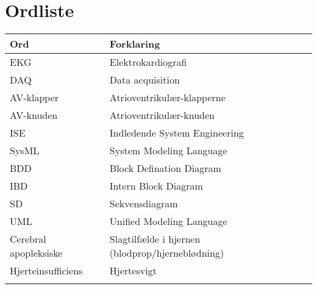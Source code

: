 \chapter{Ordliste}

\begin{longtabu} to 
    Ord &    Forklaring\\
    \toprule 
	EKG	&	Elektrokardiografi\\
	DAQ	&	Data acquisition\\
	AV-klapper	&	Atrioventrikulær-klapperne\\
	AV-knuden	&	Atrioventrikulær-knuden\\
	ISE & Indledende System Engineering \\
	SysML & System Modeling Language \\
	BDD & Block Defination Diagram \\
	IBD & Intern Block Diagram\\
	SD & Sekvensdiagram\\
	UML & Unified Modeling Language\\
	Cerebral apopleksiske &	Slagtilfælde i hjernen (blodprop/hjerneblødning)\\
	Hjerteinsufficiens	&	Hjertesvigt\\
\label{forkort}
\end{longtabu}